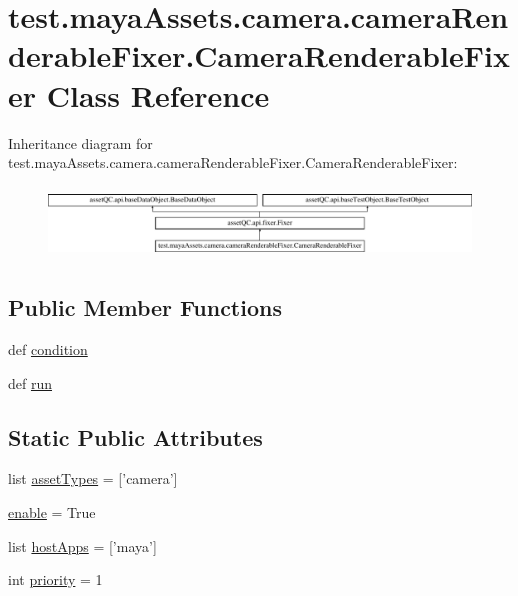 \hypertarget{classtest_1_1mayaAssets_1_1camera_1_1cameraRenderableFixer_1_1CameraRenderableFixer}{\section{test.\-maya\-Assets.\-camera.\-camera\-Renderable\-Fixer.\-Camera\-Renderable\-Fixer \-Class \-Reference}
\label{d0/d94/classtest_1_1mayaAssets_1_1camera_1_1cameraRenderableFixer_1_1CameraRenderableFixer}
}
\-Inheritance diagram for test.\-maya\-Assets.\-camera.\-camera\-Renderable\-Fixer.\-Camera\-Renderable\-Fixer\-:\begin{figure}[H]
\begin{center}
\leavevmode
\includegraphics[height=1.917808cm]{d0/d94/classtest_1_1mayaAssets_1_1camera_1_1cameraRenderableFixer_1_1CameraRenderableFixer}
\end{center}
\end{figure}
\subsection*{\-Public \-Member \-Functions}
\begin{DoxyCompactItemize}
\item 
def \hyperlink{classtest_1_1mayaAssets_1_1camera_1_1cameraRenderableFixer_1_1CameraRenderableFixer_af88080015baede81f14c581548f03a2c}{condition}
\item 
def \hyperlink{classtest_1_1mayaAssets_1_1camera_1_1cameraRenderableFixer_1_1CameraRenderableFixer_ac7bd4a3bb70425a2f752ba8e3ebc054b}{run}
\end{DoxyCompactItemize}
\subsection*{\-Static \-Public \-Attributes}
\begin{DoxyCompactItemize}
\item 
list \hyperlink{classtest_1_1mayaAssets_1_1camera_1_1cameraRenderableFixer_1_1CameraRenderableFixer_a6cca1a4f570ff623b6f4df7142f4c53b}{asset\-Types} = \mbox{[}'camera'\mbox{]}
\item 
\hyperlink{classtest_1_1mayaAssets_1_1camera_1_1cameraRenderableFixer_1_1CameraRenderableFixer_a239eab1751e49ca9480f75e6e00cea9f}{enable} = \-True
\item 
list \hyperlink{classtest_1_1mayaAssets_1_1camera_1_1cameraRenderableFixer_1_1CameraRenderableFixer_ac17b1274830e822daefcab2a78fd6c0c}{host\-Apps} = \mbox{[}'maya'\mbox{]}
\item 
int \hyperlink{classtest_1_1mayaAssets_1_1camera_1_1cameraRenderableFixer_1_1CameraRenderableFixer_a0f98813546ea33efea007da514b86cca}{priority} = 1
\end{DoxyCompactItemize}


